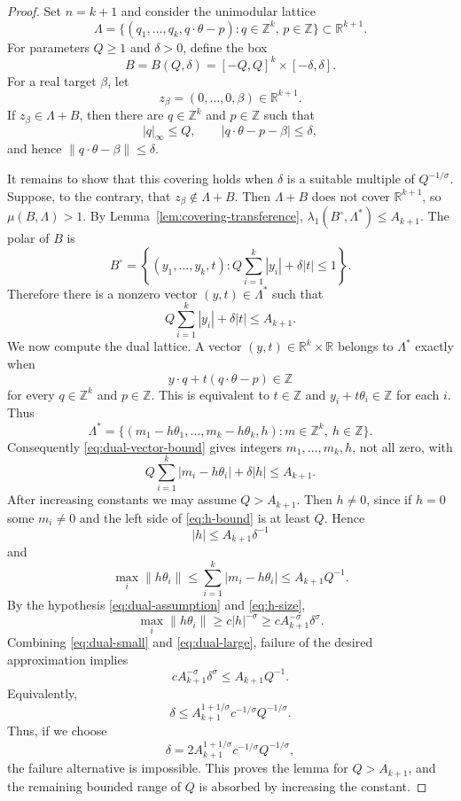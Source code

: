 \documentclass[11pt]{article}
\theoremstyle{remark}
\newcommand{\R}{\mathbb R}
\newcommand{\Z}{\mathbb Z}
\begin{document}
\begin{proof}
Set $n=k+1$ and consider the unimodular lattice
\[
  \Lambda=
  \{(q_1,\ldots,q_k,q\cdot\theta-p):q\in\Z^k,\,p\in\Z\}
  \subset\R^{k+1}.
\]
For parameters $Q\geq 1$ and $\delta>0$, define the box
\[
  B=B(Q,\delta)=[-Q,Q]^k\times[-\delta,\delta].
\]
For a real target $\beta$, let
\[
  z_\beta=(0,\ldots,0,\beta)\in\R^{k+1}.
\]
If $z_\beta\in\Lambda+B$, then there are $q\in\Z^k$ and $p\in\Z$ such that
\[
  |q|_\infty\leq Q,
  \qquad
  |q\cdot\theta-p-\beta|\leq\delta,
\]
and hence $\|q\cdot\theta-\beta\|\leq\delta$.

\bigskip
\noindent
It remains to show that this covering holds when $\delta$ is a suitable multiple of $Q^{-1/\sigma}$. Suppose, to the contrary, that $z_\beta\notin\Lambda+B$. Then $\Lambda+B$ does not cover $\R^{k+1}$, so $\mu(B,\Lambda)>1$. By Lemma~\ref{lem:covering-transference}, $\lambda_1(B^\circ,\Lambda^*)\leq A_{k+1}$. The polar of $B$ is
\[
  B^\circ=
  \left\{(y_1,\ldots,y_k,t):
  Q\sum_{i=1}^k |y_i|+\delta |t|\leq 1
  \right\}.
\]
Therefore there is a nonzero vector $(y,t)\in\Lambda^*$ such that
\[
  Q\sum_{i=1}^k |y_i|+\delta |t|\leq A_{k+1}.
  \tag{3.3}\label{eq:dual-vector-bound}
\]
We now compute the dual lattice. A vector $(y,t)\in\R^k\times\R$ belongs to $\Lambda^*$ exactly when
\[
  y\cdot q+t(q\cdot\theta-p)\in\Z
\]
for every $q\in\Z^k$ and $p\in\Z$. This is equivalent to $t\in\Z$ and $y_i+t\theta_i\in\Z$ for each $i$. Thus
\[
  \Lambda^*=
  \{(m_1-h\theta_1,\ldots,m_k-h\theta_k,h):m\in\Z^k,\ h\in\Z\}.
\]
Consequently \eqref{eq:dual-vector-bound} gives integers $m_1,\ldots,m_k,h$, not all zero, with
\[
  Q\sum_{i=1}^k |m_i-h\theta_i|+\delta |h|\leq A_{k+1}.
  \tag{3.4}\label{eq:h-bound}
\]
After increasing constants we may assume $Q>A_{k+1}$. Then $h\ne0$, since if $h=0$ some $m_i\ne0$ and the left side of \eqref{eq:h-bound} is at least $Q$. Hence
\[
  |h|\leq A_{k+1}\delta^{-1}
  \tag{3.5}\label{eq:h-size}
\]
and
\[
  \max_i\|h\theta_i\|
  \leq \sum_{i=1}^k |m_i-h\theta_i|
  \leq A_{k+1}Q^{-1}.
  \tag{3.6}\label{eq:dual-small}
\]
By the hypothesis \eqref{eq:dual-assumption} and \eqref{eq:h-size},
\[
  \max_i\|h\theta_i\|
  \geq c |h|^{-\sigma}
  \geq c A_{k+1}^{-\sigma}\delta^\sigma.
  \tag{3.7}\label{eq:dual-large}
\]
Combining \eqref{eq:dual-small} and \eqref{eq:dual-large}, failure of the desired approximation implies
\[
  c A_{k+1}^{-\sigma}\delta^\sigma\leq A_{k+1}Q^{-1}.
\]
Equivalently,
\[
  \delta\leq A_{k+1}^{1+1/\sigma}c^{-1/\sigma}Q^{-1/\sigma}.
\]
Thus, if we choose
\[
  \delta=2A_{k+1}^{1+1/\sigma}c^{-1/\sigma}Q^{-1/\sigma},
\]
the failure alternative is impossible. This proves the lemma for $Q>A_{k+1}$, and the remaining bounded range of $Q$ is absorbed by increasing the constant.
\end{proof}
\end{document}
